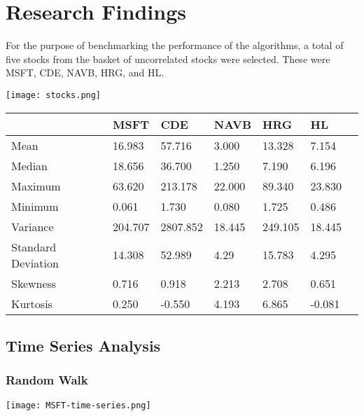 \chapter{Research Findings}
For the purpose of benchmarking the performance of the algorithms, a total of five stocks from the basket of uncorrelated stocks were selected. These were MSFT, CDE, NAVB, HRG, and HL. 

\begin{center}
    \texttt{[image: stocks.png]}
    \label{fig:nonfloat}
\end{center}

\begin{center}
    \begin{tabular}{ | l | l | l | | l | l | l | p{5cm} |}
    \hline
     & MSFT & CDE & NAVB & HRG & HL \\ \hline
    Mean & 16.983 & 57.716 & 3.000 & 13.328 & 7.154 \\ \hline
    Median & 18.656 & 36.700 & 1.250 & 7.190 & 6.196 \\ \hline
    Maximum & 63.620 & 213.178 & 22.000 & 89.340 & 23.830 \\ \hline
    Minimum & 0.061 & 1.730 & 0.080 & 1.725 & 0.486 \\ \hline
    Variance & 204.707 & 2807.852 & 18.445 & 249.105 & 18.445 \\ \hline
    Standard Deviation & 14.308 & 52.989 & 4.29 & 15.783 & 4.295 \\ \hline
    Skewness & 0.716 & 0.918 & 2.213 & 2.708 & 0.651 \\ \hline
    Kurtosis & 0.250 & -0.550 & 4.193 & 6.865 & -0.081 \\ \hline
    \hline
    \end{tabular}
    \label{table:nonfloat}
\end{center}

\section{Time Series Analysis}

\subsection{Random Walk}

\begin{center}
    \texttt{[image: MSFT-time-series.png]}
    \label{fig:nonfloat}
\end{center}


